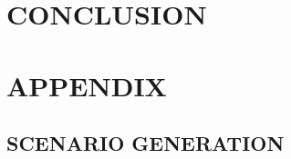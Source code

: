 


\section{CONCLUSION}





\color{black}

\section{APPENDIX}

\subsection{SCENARIO GENERATION}\label{generation}

